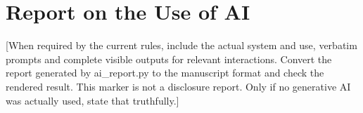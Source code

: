 \documentclass[11pt,a4paper]{article}
\begin{document}
\section*{Report on the Use of AI}
[When required by the current rules, include the actual system and use,
verbatim prompts and complete visible outputs for relevant interactions.
Convert the report generated by ai_report.py to the manuscript format and
check the rendered result. This marker is not a disclosure report.
Only if no generative AI was actually used, state that truthfully.]
\end{document}
